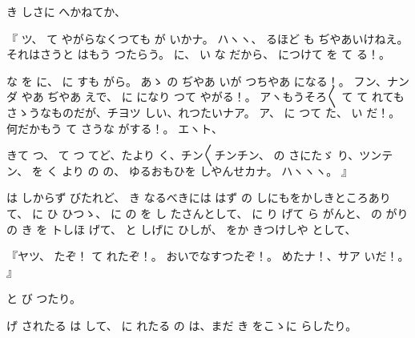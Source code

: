 き
しさに
へかねてか、

『
ツ、
て
やがらなくつても
が
いかナ。
ハヽヽ、
るほど
も
ぢやあいけねえ。
それはさうと
はもう
つたらう。
に、
い
な
だから、
につけて
を
て
る！。

な
を
に、
に
すも
がら。
あゝ
の
ぢやあ
いが
つちやあ
になる！。
フン、ナンダ
やあ
ぢやあ
えで、
に
になり
つて
やがる！。
アヽもうそろ〳〵
て
て
れても
さゝうなものだが、チヨツ
しい、れつたいナア。
ア、
に
つて
た、
い
だ！。
何だかもう
て
さうな
がする！。
エヽト、

きて
つ、
て
つ
てど、たより
く、チン〳〵チンチン、
の
さにたゞ
り、ツンテン、
を
く
より
の
の、
ゆるおもひを
しやんせカナ。
ハヽヽヽ。
』

は
しからず
びたれど、
き
なるべきには
はず
の
しにもをかしきところありて、
に
ひ
ひつゝ、
に
の
を
し
たさんとして、
に
り
げて
ら
がんと、
の
がりの
き
を
トしほ
げて、
と
しげに
ひしが、
をか
きつけしや
として、

『ヤツ、
たぞ！
て
れたぞ！。
おいでなすつたぞ！。
めたナ！、サア
いだ！。
』

と
び
つたり。

げ
されたる
は
して、
に
れたる
の
は、まだ
き
をこゝに
らしたり。

